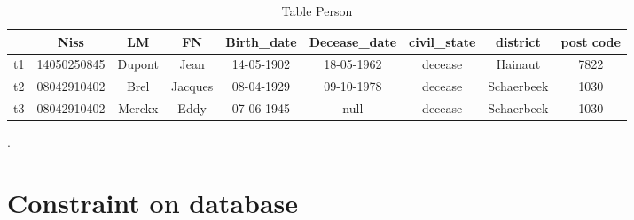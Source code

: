 \documentclass[letterpaper, 12pt]{report}
\newcommand{\alinea}{
\hspace*{0.5cm}}
\begin{document}
\begin{table}[H]
	\centering
	\hspace*{-1.5cm}\begin{tabular}{|c|c c c c c c c c|}
	\hline
	    & Niss & LM & FN & Birth\_date & Decease\_date & civil\_state & district & post code\\
	\hline
	 t1 & 14050250845 & Dupont & Jean & 14-05-1902 & 18-05-1962 & decease & Hainaut & 7822\\
	 t2 & 08042910402 & Brel & Jacques & 08-04-1929 & 09-10-1978 & decease & Schaerbeek & 1030\\
	 t3 & 08042910402 & Merckx & Eddy & 07-06-1945 & null & decease & Schaerbeek & 1030\\
	\hline
	 
	 \hline
	\end{tabular}
	\caption{\label{tablePerson} Table Person}.
\end{table}

\newpage

%
%
\section{Constraint on database}
\end{document}
